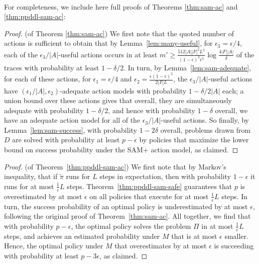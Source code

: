 \documentclass[letterpaper]{article} %
\begin{document}


\newpage\ 
\newpage

\noindent
For completeness, we include here full proofs of Theorems \ref{thm:sam-ac} and \ref{thm:ppddl-sam-ac}:

\begin{proof} (of Theorem \ref{thm:sam-ac})
We first note that the quoted number of actions is sufficient to obtain that by Lemma~\ref{lem:many-useful}, for $\epsilon_3 = \epsilon/4$, each of the $\epsilon_3/|A|$-useful actions occurs in at least
$
m'\geq \frac{512 |A||F|^2L^2}{(1-\epsilon)^2\epsilon^3}\log\frac{4|F||A|}{\delta}
$
of the traces with probability at least $1-\delta/2$. In turn, by Lemma~\ref{lem:sam-adequate}, for each of these actions, for $\epsilon_1 = \epsilon/4$ and $\epsilon_2 = \frac{\epsilon(1-\epsilon)^2}{2|F|L}$, the
$\epsilon_3/|A|$-useful actions have $(\epsilon_1/|A|,\epsilon_2)$-adequate action models with probability $1-\delta/2|A|$ each; a union bound over these actions gives that overall, they are simultaneously adequate with probability $1-\delta/2$, and hence with probability $1-\delta$ overall, we have an adequate action model for all of the $\epsilon_3/|A|$-useful actions. So finally, by Lemma~\ref{lem:sam-success}, with probability $1-2\delta$ overall, problems drawn from $D$ are solved with probability at least $p-\epsilon$ by policies that maximize the lower bound on success probability under the SAM+ action model, as claimed.
\end{proof}

\begin{proof} (of Theorem~\ref{thm:ppddl-sam-ac})
We first note that by Markov's inequality, that if $\tilde{\pi}$ runs for $L$ steps in expectation, then with probability $1-\epsilon$ it runs for at most $\frac{1}{\epsilon}L$ steps. Theorem~\ref{thm:ppddl-sam-safe} guarantees that $p$ is overestimated by at most $\epsilon$ on all policies that execute for at most $\frac{1}{\epsilon}L$ steps. In turn, the success probability of an optimal policy is underestimated by at most $\epsilon$, following the original proof of Theorem~\ref{thm:sam-ac}. All together, we find that with probability $p-\epsilon$, the optimal policy solves the problem $\Pi$ in at most $\frac{1}{\epsilon}L$ steps, and achieves an estimated probability under $M$ that is at most $\epsilon$ smaller. Hence, the optimal policy under $M$ that overestimates by at most $\epsilon$ is succeeding with probability at least $p-3\epsilon$, as claimed. 
\end{proof}
\end{document}
